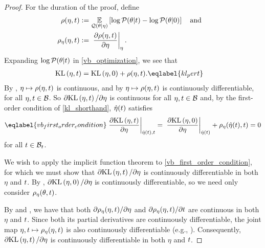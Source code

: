 \begin{proof}
%
For the duration of the proof, define
%
\begin{align*}
%
\rho(\eta, \t) :={}&
    \expect{\q(\theta \vert \eta)}
           {\log \p(\theta \vert \t) - \log \p(\theta \vert 0)}
\mathand\\
\rho_\eta(\eta, \t) :={}&
\fracat{\partial \rho(\eta, \t)}
       {\partial \eta}{\eta}.
%
\end{align*}
%
Expanding $\log \mathcal{P}(\theta \vert t)$ in \eqref{vb_optimization}, we see that
%
\begin{align}
%
\KL{\eta, \t} ={}&
    \KL{\eta, 0} + \rho(\eta, \t). \eqlabel{kl_pert}
%
\end{align}
%
%
By , $\eta \mapsto \rho(\eta, t)$ is continuous, and
by  $\eta \mapsto \rho(\eta, t)$ is continuously
differentiable, for all $\eta, t \in \mathcal{B}$.  So $\partial \mathrm{KL}\left(\eta, t\right)  /
\partial \eta$ is continuous for all $\eta, t \in \mathcal{B}$ and, by the
first-order condition of \eqref{kl_shorthand}, $\hat\eta(t)$ satisfies
%
\begin{align}\eqlabel{vb_first_order_condition}
%
\fracat{\partial \KL{\eta, \t}}{ \partial \eta}{\etaopt(\t), \t} ={}
\fracat{\partial \KL{\eta, 0}}{ \partial \eta}{\etaopt(\t)}
+  \rho_\eta(\etaopt(\t), \t) ={} 0
%
\end{align}
%
for all $t \in \mathcal{B}_t$.

We wish to apply the implicit function theorem to
\eqref{vb_first_order_condition}, for which we must show that $\partial
\mathrm{KL}\left(\eta, t\right) / \partial \eta$ is continuously differentiable in both $\eta$ and
$t$.  By , $\partial \mathrm{KL}\left(\eta, 0\right) /
\partial \eta$ is continuously differentiable, so we need only consider
$\rho_\eta(\theta, t)$.

By  and , we
have that both $\partial \rho_\eta(\eta, t) / \partial \eta$ and $\partial
\rho_\eta(\eta, t) / \partial t$ are continuous in both $\eta$ and $t$.
Since both its partial derivatives are continuously differentiable, the joint
map $\eta, t \mapsto \rho_\eta(\eta, t)$ is also continuously differentiable
(e.g., \citet[Theorem 3.2]{fleming:2012:functions}).  Consequently, $\partial
\mathrm{KL}\left(\eta, t\right) / \partial \eta$ is continuously differentiable in both $\eta$ and
$t$.


\end{proof}

